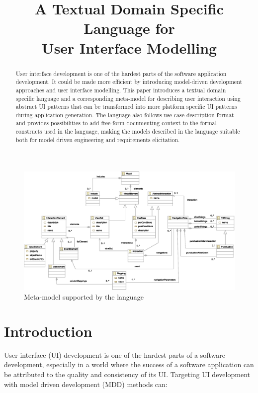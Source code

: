 \documentclass[conference]{IEEEtran}
\begin{document}
\title{A Textual Domain Specific Language for\\
User Interface Modelling}
\author{
}
\maketitle

\begin{abstract}
User interface development is one of the hardest parts of the software
application development. It could be made more efficient by introducing
model-driven development approaches and user interface modelling.  This paper
introduces a textual domain specific language and a corresponding meta-model
for describing user interaction using abstract UI patterns that can be
transformed into more platform specific UI patterns during application
generation. The language also follows use case description format and provides
possibilities to add free-form documenting context to the formal constructs
used in the language, making the models described in the language suitable both
for model driven engineering and requirements elicitation.
\end{abstract}

\IEEEpeerreviewmaketitle

\begin{figure}
  \centering
    \includegraphics[width=1\textwidth]{viewsetdsl.eps}
      \caption{Meta-model supported by the language}
      \label{fig:metamodel}
\end{figure}

\section{Introduction}
User interface (UI) development is one of the hardest parts of a software
development, especially in a world where the success of a software application
can be attributed to the quality and consistency of its UI\@. Targeting UI
development with model driven development (MDD) methods can:
\end{document}

